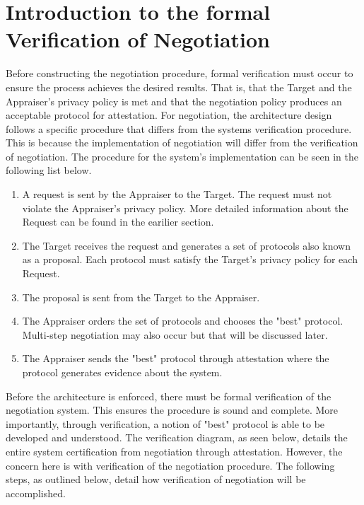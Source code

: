 \documentclass[10pt]{report}
\begin{document}
\section {Introduction to the formal Verification of Negotiation}

Before constructing the negotiation procedure, formal verification must occur to ensure the process achieves the desired results. That is, that the Target and the Appraiser's privacy policy is met and that the negotiation policy produces an acceptable protocol for attestation. For negotiation, the architecture design follows a specific procedure that differs from the systems verification procedure. This is because the implementation of negotiation will differ from the verification of negotiation. The procedure for the system's implementation can be seen in the following list below. 

\begin{enumerate}
\item A request is sent by the Appraiser to the Target. The request must not violate the Appraiser's privacy policy. More detailed information about the Request can be found in the earilier section. 
\item The Target receives the request and generates a set of protocols also known as a proposal. Each protocol must satisfy the Target's privacy policy for each Request. 
\item The proposal is sent from the Target to the Appraiser.  
\item The Appraiser orders the set of protocols and chooses the "best" protocol. Multi-step negotiation may also occur but that will be discussed later. 
\item The Appraiser sends the "best" protocol through attestation where the protocol generates evidence about the system. 
\end{enumerate}

Before the architecture is enforced, there must be formal verification of the negotiation system. This ensures the procedure is sound and complete. More importantly, through verification, a notion of "best" protocol is able to be developed and understood. The verification diagram, as seen below, details the entire system certification from negotiation through attestation. However, the concern here is with verification of the negotiation procedure. The following steps, as outlined below, detail how verification of negotiation will be accomplished.  
\end{document}
